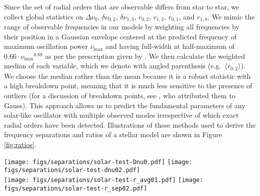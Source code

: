 \documentclass[manuscript]{aastex}
\begin{document}
Since the set of radial orders that are observable differs from star to star, we collect global statistics on $\Delta\nu_0$, $\delta\nu_{0,2}$, $\delta\nu_{1,3}$, $r_{0,2}$, $r_{1,3}$, $r_{0,1}$, and $r_{1,0}$. We mimic the range of observable frequencies in our models by weighting all frequencies by their position in a Gaussian envelope centered at the predicted frequency of maximum oscillation power $\nu_{\max}$ and having full-width at half-maximum of $0.66\cdot\nu_{\max}{}^{0.88}$ as per the prescription given by \citet{2012A&A...537A..30M}. We then calculate the weighted median of each variable, which we denote with angled parenthesis (e.g.~$\langle r_{0,2}\rangle$). We choose the median rather than the mean because it is a robust statistic with a high breakdown point, meaning that it is much less sensitive to the presence of outliers (for a discussion of breakdown points, see \citealt{hampel1971general}, who attributed them to Gauss). This approach allows us to predict the fundamental parameters of any solar-like oscillator with multiple observed modes irrespective of which exact radial orders have been detected. Illustrations of these methods used to derive the frequency separations and ratios of a stellar model are shown in Figure \ref{fig:ratios}. 

\begin{figure*}
    \centering
    \texttt{[image: figs/separations/solar-test-Dnu0.pdf]}\hfill
    \texttt{[image: figs/separations/solar-test-dnu02.pdf]}\\
    \texttt{[image: figs/separations/solar-test-r\_avg01.pdf]}\hfill
    \texttt{[image: figs/separations/solar-test-r\_sep02.pdf]}%
    \caption{The large and small frequency separations $\Delta\nu_0$ and $\delta\nu_{0,2}$ (top) and frequency ratios $r_{0,1}$ and $r_{0,2}$ (bottom) of a stellar model plotted as a function of frequency. The vertical dotted line indicates $\nu_{\max}$. A $\nu_{\max}$-weighted linear fit is indicated with a dashed diagonal line to guide the eye. Point sizes and colors are proportional to the applied weighting, with blue points having a large influence and red points having little. }%
    \label{fig:ratios}
\end{figure*}
\end{document}
